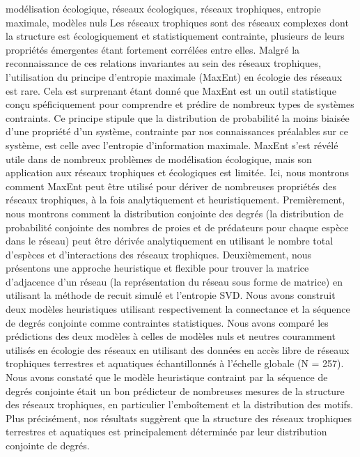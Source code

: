 \begin{resume}{modélisation écologique, réseaux écologiques, réseaux trophiques, entropie maximale, modèles nuls}
  Les réseaux trophiques sont des réseaux complexes dont la structure est
  écologiquement et statistiquement contrainte, plusieurs de leurs propriétés
  émergentes étant fortement corrélées entre elles. Malgré la reconnaissance de
  ces relations invariantes au sein des réseaux trophiques, l'utilisation du
  principe d'entropie maximale (MaxEnt) en écologie des réseaux est rare. Cela
  est surprenant étant donné que MaxEnt est un outil statistique conçu
  spéficiquement pour comprendre et prédire de nombreux types de systèmes
  contraints. Ce principe stipule que la distribution de probabilité la moins
  biaisée d'une propriété d'un système, contrainte par nos connaissances
  préalables sur ce système, est celle avec l'entropie d'information maximale.
  MaxEnt s'est révélé utile dans de nombreux problèmes de modélisation
  écologique, mais son application aux réseaux trophiques et écologiques est
  limitée. Ici, nous montrons comment MaxEnt peut être utilisé pour dériver de
  nombreuses propriétés des réseaux trophiques, à la fois analytiquement et
  heuristiquement. Premièrement, nous montrons comment la distribution conjointe
  des degrés (la distribution de probabilité conjointe des nombres de proies et
  de prédateurs pour chaque espèce dans le réseau) peut être dérivée
  analytiquement en utilisant le nombre total d'espèces et d'interactions des
  réseaux trophiques. Deuxièmement, nous présentons une approche heuristique et
  flexible pour trouver la matrice d'adjacence d'un réseau (la représentation du
  réseau sous forme de matrice) en utilisant la méthode de recuit simulé et
  l'entropie SVD. Nous avons construit deux modèles heuristiques utilisant
  respectivement la connectance et la séquence de degrés conjointe comme
  contraintes statistiques. Nous avons comparé les prédictions des deux modèles
  à celles de modèles nuls et neutres couramment utilisés en écologie des
  réseaux en utilisant des données en accès libre de réseaux trophiques
  terrestres et aquatiques échantillonnés à l'échelle globale (N = 257). Nous
  avons constaté que le modèle heuristique contraint par la séquence de degrés
  conjointe était un bon prédicteur de nombreuses mesures de la structure des
  réseaux trophiques, en particulier l'emboîtement et la distribution des
  motifs. Plus précisément, nos résultats suggèrent que la structure des réseaux
  trophiques terrestres et aquatiques est principalement déterminée par leur
  distribution conjointe de degrés.
\end{resume}

